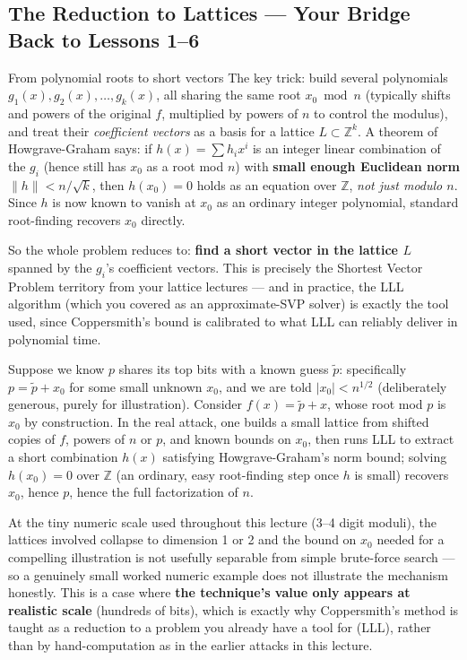 \subsection{The Reduction to Lattices — Your Bridge Back to Lessons 1--6}

\begin{keybox}{From polynomial roots to short vectors}
The key trick: build several polynomials $g_1(x), g_2(x), \dots, g_k(x)$, all sharing the same root $x_0 \bmod n$ (typically shifts and powers of the original $f$, multiplied by powers of $n$ to control the modulus), and treat their \emph{coefficient vectors} as a basis for a lattice $L \subset \mathbb{Z}^k$. A theorem of Howgrave-Graham says: if $h(x) = \sum h_i x^i$ is an integer linear combination of the $g_i$ (hence still has $x_0$ as a root mod $n$) with \textbf{small enough Euclidean norm} $\|h\| < n/\sqrt{k}$, then $h(x_0) = 0$ holds as an equation over $\mathbb{Z}$, \emph{not just modulo $n$}. Since $h$ is now known to vanish at $x_0$ as an ordinary integer polynomial, standard root-finding recovers $x_0$ directly.

So the whole problem reduces to: \textbf{find a short vector in the lattice $L$} spanned by the $g_i$'s coefficient vectors. This is precisely the Shortest Vector Problem territory from your lattice lectures — and in practice, the LLL algorithm (which you covered as an approximate-SVP solver) is exactly the tool used, since Coppersmith's bound is calibrated to what LLL can reliably deliver in polynomial time.
\end{keybox}

\begin{example}
Suppose we know $p$ shares its top bits with a known guess $\tilde{p}$: specifically $p = \tilde p + x_0$ for some small unknown $x_0$, and we are told $|x_0| < n^{1/2}$ (deliberately generous, purely for illustration). Consider $f(x) = \tilde p + x$, whose root mod $p$ is $x_0$ by construction. In the real attack, one builds a small lattice from shifted copies of $f$, powers of $n$ or $p$, and known bounds on $x_0$, then runs LLL to extract a short combination $h(x)$ satisfying Howgrave-Graham's norm bound; solving $h(x_0)=0$ over $\mathbb{Z}$ (an ordinary, easy root-finding step once $h$ is small) recovers $x_0$, hence $p$, hence the full factorization of $n$.

At the tiny numeric scale used throughout this lecture (3–4 digit moduli), the lattices involved collapse to dimension 1 or 2 and the bound on $x_0$ needed for a compelling illustration is not usefully separable from simple brute-force search — so a genuinely small worked numeric example does not illustrate the mechanism honestly. This is a case where \textbf{the technique's value only appears at realistic scale} (hundreds of bits), which is exactly why Coppersmith's method is taught as a reduction to a problem you already have a tool for (LLL), rather than by hand-computation as in the earlier attacks in this lecture.
\end{example}

